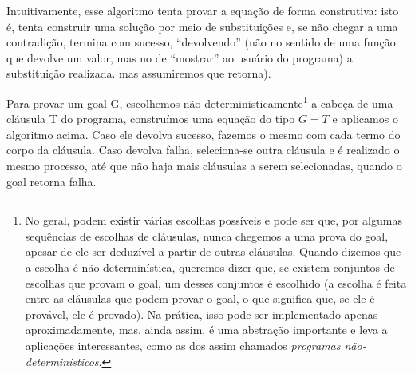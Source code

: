 \documentclass{article}
\theoremstyle{remark}
\theoremstyle{theorem}
\begin{document}

Intuitivamente, esse algoritmo tenta provar a equação de forma construtiva: isto é, tenta construir uma solução por meio de substituições e, se não chegar a uma contradição, termina com sucesso, ``devolvendo'' (não no sentido de uma função que devolve um valor, mas no de ``mostrar'' ao usuário do programa) a substituição realizada.
mas assumiremos que retorna). %

Para provar um goal G, escolhemos não-deterministicamente\footnote{No geral, podem existir várias escolhas possíveis e pode ser que, por algumas sequências de escolhas de cláusulas, nunca chegemos a uma prova do goal, apesar de ele ser deduzível a partir de outras cláusulas. Quando dizemos que a escolha é não-determinística, queremos dizer que, se existem conjuntos de escolhas que provam o goal, um desses conjuntos é escolhido (a escolha é feita entre as cláusulas que podem provar o
  goal, o que significa que, se ele é provável, ele é provado). Na prática, isso pode ser implementado apenas aproximadamente, mas, ainda assim, é uma abstração importante e leva a aplicações interessantes, como as dos assim chamados \textit{programas não-determinísticos}.} a cabeça de uma cláusula T do programa, construímos uma equação do tipo $G = T$ e aplicamos o algoritmo acima. Caso ele devolva sucesso, fazemos o mesmo com cada termo do corpo da cláusula. Caso devolva falha, seleciona-se outra cláusula e é realizado o mesmo processo, até que não haja mais cláusulas a serem selecionadas, quando o goal retorna falha.
\end{document}
